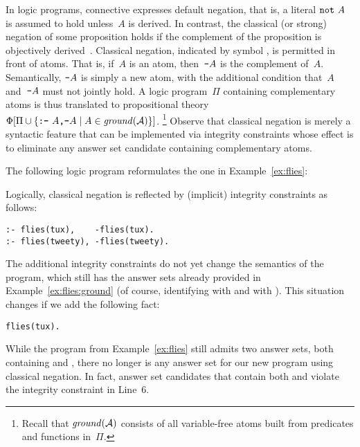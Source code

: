 In logic programs, connective  expresses default negation,
that is, a literal $\texttt{not}~A$ is assumed to hold unless~$A$ is derived.
In contrast, the classical (or strong) negation of some proposition
holds if the complement of the proposition is objectively derived~\cite{gellif91a}.
Classical negation, indicated by symbol \code{-}, is permitted in front of atoms.
That is, if~$A$ is an atom, then~$\texttt{-}A$ is the complement of~$A$.
Semantically, $\texttt{-}A$ is simply a new atom,
with the additional condition that~$A$ and~$\texttt{-}A$ must not jointly hold.
A logic program~$\Pi$ containing complementary atoms is thus translated
to propositional theory
$\Phi[\Pi \cup \{\texttt{:-}~A\texttt{,}\texttt{-}A \mid A\in\mathit{ground}(\mathcal{A})\}]$.%
\footnote{Recall that $\mathit{ground}(\mathcal{A})$ consists of all variable-free atoms
built from predicates and functions in~$\Pi$.}
Observe that classical negation is merely a syntactic feature that can be
implemented via integrity constraints whose effect is to eliminate
any answer set candidate containing complementary atoms.

\begin{example}\label{ex:flies:neg}
The following logic program reformulates the one in Example~\ref{ex:flies}:
%


%
Logically, classical negation is reflected by
(implicit) integrity constraints as follows:%
%
\begin{lstlisting}[firstnumber=6]
:- flies(tux),    -flies(tux).
:- flies(tweety), -flies(tweety).
\end{lstlisting}
The additional integrity constraints do not yet change the semantics of the
program, which still has the answer sets already provided in Example~\ref{ex:flies:ground}
(of course, identifying
 with
 and
 with
).
This situation changes if we add the following fact:
\begin{lstlisting}[firstnumber=8]
flies(tux).
\end{lstlisting}
While the program from Example~\ref{ex:flies} still admits two answer sets,
both containing 
 and
,
there no longer is any answer set for our new program using classical negation.
In fact, answer set candidates that contain both
 and
 violate the integrity constraint in Line~6.
\eexample
\end{example}


